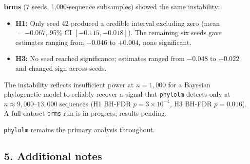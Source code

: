 \documentclass[11pt, a4paper]{article}
\begin{document}
\textbf{brms} (7 seeds, 1{,}000-sequence subsamples) showed the same
instability:
\begin{itemize}
  \item \textbf{H1:} Only seed 42 produced a credible interval excluding zero
        (mean $= -0.067$, 95\% CI $[-0.115, -0.018]$). The remaining six seeds
        gave estimates ranging from $-0.046$ to $+0.004$, none significant.
  \item \textbf{H3:} No seed reached significance; estimates ranged from
        $-0.048$ to $+0.022$ and changed sign across seeds.
\end{itemize}

The instability reflects insufficient power at $n = 1{,}000$ for a Bayesian
phylogenetic model to reliably recover a signal that \texttt{phylolm} detects
only at $n \approx 9{,}000$--$13{,}000$ sequences (H1 BH-FDR $p = 3 \times
10^{-4}$, H3 BH-FDR $p = 0.016$). A full-dataset \texttt{brms} run is in
progress; results pending.

\texttt{phylolm} remains the primary analysis throughout.

\subsection*{5. Additional notes}
\end{document}
